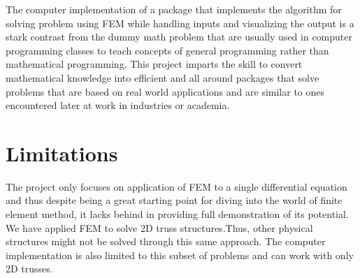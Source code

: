 The computer implementation of a package that implements the algorithm for solving problem using FEM while handling inputs and visualizing the output is a stark contrast from the dummy math problem that are usually used in computer programming classes to teach concepts of general programming rather than mathematical programming. This project imparts the skill to convert mathematical knowledge into efficient and all around packages that solve problems that are based on real world applications and are similar to ones encountered later at work in industries or academia.

\section{\bf Limitations}

The project only focuses on application of FEM to a single differential equation and thus despite being a great starting point for diving into the world of finite element method, it lacks behind in providing full demonstration of its potential. We have applied FEM to solve 2D truss structures.Thus, other physical structures might not be solved through this same approach. The computer implementation is also limited to this subset of problems and can work with only 2D trusses.
